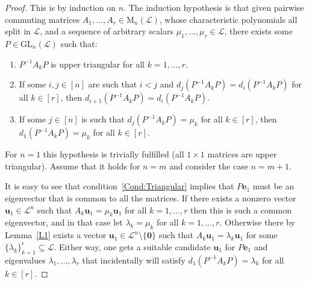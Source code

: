 \documentclass[12pt]{article}
\newcommand{\mc}{\mathcal}
\newcommand{\vek}{\mathbf}
\newcommand{\Mat}{\mathrm{M}}
\newcommand{\GL}{\mathrm{GL}}
\begin{document}
\begin{proof}
  This is by induction on $n$. The induction hypothesis is that given 
  pairwise commuting matrices \(A_1,\dotsc,A_r \in \Mat_n(\mc{L})\), 
  whose characteristic polynomials all split in $\mc{L}$, and a 
  sequence of arbitrary scalars \(\mu_1,\dotsc,\mu_r \in \mc{L}\), 
  there exists some \(P \in \GL_n(\mc{L})\) such that:
  \begin{enumerate}
    \item \label{Cond:Triangular}
      \(P^{-1} A_k P\) is upper triangular for all \(k=1,\dotsc,r\).
    \item \label{Cond:Block}
      If some \(i,j \in [n]\) are such that \(i<j\) and 
      \(d_j(P^{-1} A_k P) = d_i(P^{-1} A_k P)\) for all \(k \in [r]\), 
      then \(d_{i+1}(P^{-1} A_k P) = d_i(P^{-1} A_k P)\).
    \item \label{Cond:Forst}
      If some \(j \in [n]\) is such that \(d_j(P^{-1} A_k P) = \mu_k\) 
      for all \(k \in [r]\), then \(d_1(P^{-1} A_k P) = \mu_k\) 
      for all \(k \in [r]\).
  \end{enumerate}
  For \(n=1\) this hypothesis is trivially fulfilled (all $1 \times 1$ 
  matrices are upper triangular). Assume that it holds for \(n=m\) and 
  consider the case \(n=m+1\).
  
  It is easy to see that condition~\ref{Cond:Triangular} implies 
  that $P\vek{e}_1$ must be an eigenvector that is common to all the 
  matrices. If there exists a nonzero vector \(\vek{u}_1 \in \mc{L}^n\) 
  such that \(A_k \vek{u}_1 = \mu_k \vek{u}_1\) for all \(k=1,\dotsc,r\) 
  then this is such a common eigenvector, and in that case let 
  \(\lambda_k=\mu_k\) for all \(k=1,\dotsc,r\). Otherwise there by 
  Lemma~\ref{L1} exists a vector
  \(\vek{u}_1 \in \mc{L}^n \setminus \{\vek{0}\}\) such that 
  \(A_k \vek{u}_1 = \lambda_k \vek{u}_1\) for some 
  \(\{\lambda_k\}_{k=1}^r \subseteq \mc{L}\). Either way, one gets a 
  suitable candidate $\vek{u}_1$ for $P\vek{e}_1$ and eigenvalues 
  \(\lambda_1,\dotsc,\lambda_r\) that incidentally will satisfy 
  \(d_1(P^{-1} A_k P) = \lambda_k\) for all \(k \in [r]\).
  

\end{proof}
\end{document}
